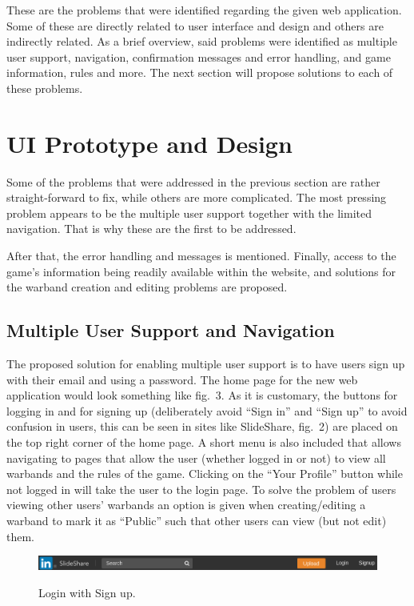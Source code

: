 \documentclass[12pt,a4paper]{article}
\begin{document}
These are the problems that were identified regarding the given web application. Some of these are directly related to user interface and design and others are indirectly related. As a brief overview, said problems were identified as multiple user support, navigation, confirmation messages and error handling, and game information, rules and more. The next section will propose solutions to each of these problems.

\section{UI Prototype and Design}

Some of the problems that were addressed in the previous section are rather straight-forward to fix, while others are more complicated. The most pressing problem appears to be the multiple user support together with the limited navigation. That is why these are the first to be addressed. 

After that, the error handling and messages is mentioned. Finally, access to the game's information being readily available within the website, and solutions for the warband creation and editing problems are proposed.

\subsection{Multiple User Support and Navigation}

The proposed solution for enabling multiple user support is to have users sign up with their email and using a password. The home page for the new web application would look something like fig.~3. As it is customary, the buttons for logging in and for signing up (deliberately avoid ``Sign in'' and ``Sign up'' to avoid confusion in users, this can be seen in sites like SlideShare, fig.~2) are placed on the top right corner of the home page. A short menu is also included that allows navigating to pages that allow the user (whether logged in or not) to view all warbands and the rules of the game. Clicking on the ``Your Profile'' button while not logged in will take the user to the login page. To solve the problem of users viewing other users' warbands an option is given when creating/editing a warband to mark it as ``Public'' such that other users can view (but not edit) them.

\begin{figure}[h!]
 \centering
 \includegraphics[width=1\textwidth]{img/login_signup}
 \label{fig:2}
 \caption{Login with Sign up.}
\end{figure}
\end{document}
